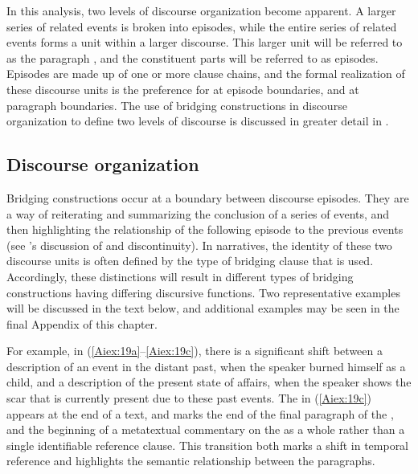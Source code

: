 \documentclass[output=paper]{LSP/langsci}
\begin{document}
In this analysis, two levels of discourse organization become apparent. A larger series of related events is broken into episodes, while the entire series of related events forms a  unit within a larger discourse. This larger unit will be referred to as the paragraph \citep[corresponding to the idea of a paragraph in][372]{Thompson.et.al.2007}, and the constituent parts will be referred to as episodes. Episodes are made up of one or more clause chains, and the formal realization of these discourse units is the preference for  at episode boundaries, and  at paragraph boundaries. The use of bridging constructions in discourse organization to define two levels of discourse is discussed in greater detail in \citet{Aiton.2015}.

\subsection{Discourse organization} 
\label{Aidiscourse.org}
Bridging constructions occur at a boundary between discourse episodes. They are a way of reiterating and summarizing the conclusion of a series of events, and then highlighting the relationship of the following episode to the previous events (see \citeauthor{devries.2005}’s \citeyear{devries.2005} discussion of  and discontinuity). In  narratives, the identity of these two discourse units is often defined by the type of bridging clause that is used. Accordingly, these distinctions will result in different types of bridging constructions having differing discursive functions. Two representative examples will be discussed in the text below, and additional examples may be seen in the final Appendix of this chapter.

	For example, in (\ref{Aiex:19a}--\ref{Aiex:19c}), there is a significant shift between a description of an event in the distant past, when the speaker burned himself as a child, and a description of the present state of affairs, when the speaker shows the scar that is currently present due to these past events. The  in (\ref{Aiex:19c}) appears at the end of a text, and marks the end of the final paragraph of the , and the beginning of a metatextual commentary on the  as a whole rather than a single identifiable reference clause. This transition both marks a shift in temporal reference and highlights the semantic relationship between the paragraphs.
	
\end{document}
